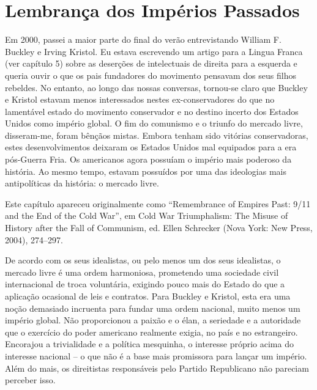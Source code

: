 \chapter{Lembrança dos Impérios Passados}\label{Lembrança dos Impérios Passados}
 \par 
Em 2000, passei a maior parte do final do verão entrevistando William F. Buckley e Irving Kristol. Eu estava escrevendo um artigo para a Lingua Franca (ver capítulo {\color{blue}5}) sobre as deserções de intelectuais de direita para a esquerda e queria ouvir o que os pais fundadores do movimento pensavam dos seus filhos rebeldes. No entanto, ao longo das nossas conversas, tornou-se claro que Buckley e Kristol estavam menos interessados ​​nestes ex-conservadores do que no lamentável estado do movimento conservador e no destino incerto dos Estados Unidos como império global. O fim do comunismo e o triunfo do mercado livre, disseram-me, foram bênçãos mistas. Embora tenham sido vitórias conservadoras, estes desenvolvimentos deixaram os Estados Unidos mal equipados para a era pós-Guerra Fria. Os americanos agora possuíam o império mais poderoso da história. Ao mesmo tempo, estavam possuídos por uma das ideologias mais antipolíticas da história: o mercado livre.
 \par 
Este capítulo apareceu originalmente como “Remembrance of Empires Past: 9/11 and the End of the Cold War”, em Cold War Triumphalism: The Misuse of History after the Fall of Communism, ed. Ellen Schrecker (Nova York: New Press, 2004), 274–297.
 \par 
De acordo com os seus idealistas, ou pelo menos um dos seus idealistas, o mercado livre é uma ordem harmoniosa, prometendo uma sociedade civil internacional de troca voluntária, exigindo pouco mais do Estado do que a aplicação ocasional de leis e contratos. Para Buckley e Kristol, esta era uma noção demasiado incruenta para fundar uma ordem nacional, muito menos um império global. Não proporcionou a paixão e o élan, a seriedade e a autoridade que o exercício do poder americano realmente exigia, no país e no estrangeiro. Encorajou a trivialidade e a política mesquinha, o interesse próprio acima do interesse nacional – o que não é a base mais promissora para lançar um império. Além do mais, os direitistas responsáveis ​​pelo Partido Republicano não pareciam perceber isso.
 \par 

